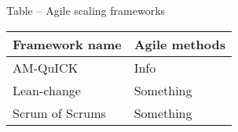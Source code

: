 \centering
Table – Agile scaling frameworks

\begin{tabular}{l l}
    \bfseries{Framework name} & \bfseries{Agile methods} \\
    \hline
    AM-QuICK & Info \\
    Lean-change & Something  \\
    Scrum of Scrums & Something \\
    \hline
\end{tabular}
\justify
